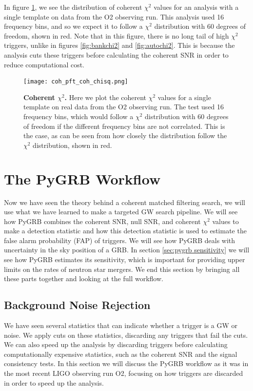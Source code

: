 \documentclass[11pt]{cuthesis}
\begin{document}
In figure \ref{fig:cohchi2}, we see the distribution of coherent $\chi^2$ values for an analysis with a single template on data from the O2 observing run. This analysis used 16 frequency bins, and so we expect it to follow a $\chi^2$ distribution with 60 degrees of freedom, shown in red. Note that in this figure, there is no long tail of high $\chi^2$ triggers, unlike in figures \ref{fig:bankchi2} and \ref{fig:autochi2}. This is because the analysis cuts these triggers before calculating the coherent SNR in order to reduce computational cost.

\begin{figure} %
\begin{center}
\texttt{[image: coh\_pft\_coh\_chisq.png]}
\end{center}
\caption{\textbf{Coherent $\chi^2$.} Here we plot the coherent $\chi^2$ values for a single template on real data from the O2 observing run. The test used 16 frequency bins, which would follow a $\chi^2$ distribution with 60 degrees of freedom if the different frequency bins are not correlated. This is the case, as can be seen from how closely the distribution follow the $\chi^2$ distribution, shown in red.}
\label{fig:cohchi2}
\end{figure}

\section{The PyGRB Workflow} \label{sec:pygrb workflow}
Now we have seen the theory behind a coherent matched filtering search, we will use what we have learned to make a targeted GW search pipeline. We will see how PyGRB combines the coherent SNR, null SNR, and coherent $\chi^2$ values to make a detection statistic and how this detection statistic is used to estimate the false alarm probability (FAP) of triggers. We will see how PyGRB deals with uncertainty in the sky position of a GRB. In section \ref{sec:pygrb sensitivity} we will see how PyGRB estimates its sensitivity, which is important for providing upper limits on the rates of neutron star mergers. We end this section by bringing all these parts together and looking at the full workflow.

\subsection{Background Noise Rejection} \label{sec:thresholds}
We have seen several statistics that can indicate whether a trigger is a GW or noise. We apply cuts on these statistics, discarding any triggers that fail the cuts. We can also speed up the analysis by discarding triggers before calculating computationally expensive statistics, such as the coherent SNR and the signal consistency tests. In this section we will discuss the PyGRB workflow as it was in the most recent LIGO observing run O2, focusing on how triggers are discarded in order to speed up the analysis.
\end{document}
